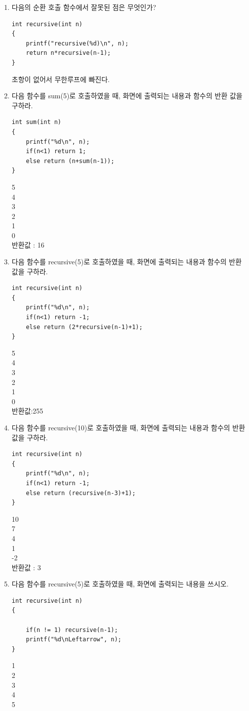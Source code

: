 \documentclass[11pt,a4paper]{article}
\begin{document}
\begin{enumerate}
\item 다음의 순환 호출 함수에서 잘못된 점은 무엇인가?
\begin{lstlisting}[frame=none]
int recursive(int n)
{
	printf("recursive(%d)\n", n);
	return n*recursive(n-1);
}
\end{lstlisting}
초항이 없어서 무한루프에 빠진다.
	
\item 다음 함수를 sum(5)로 호출하였을 때, 화면에 출력되는 내용과 함수의 반환 값을 구하라.
\begin{lstlisting}[frame=none]
int sum(int n)
{
	printf("%d\n", n);
	if(n<1) return 1;
	else return (n+sum(n-1));
}
\end{lstlisting}
5\\
4\\
3\\
2\\
1\\
0\\
반환값 : 16
\item 다음 함수를 recursive(5)로 호출하였을 때, 화면에 출력되는 내용과 함수의 반환 값을 구하라.
\begin{lstlisting}[frame=none]
int recursive(int n)
{
	printf("%d\n", n);
	if(n<1) return -1;
	else return (2*recursive(n-1)+1);
}
\end{lstlisting}
5\\
4\\
3\\
2\\
1\\
0\\
반환값:255
\item 다음 함수를 recursive(10)로 호출하였을 때, 화면에 출력되는 내용과 함수의 반환 값을 구하라.
\begin{lstlisting}[frame=none]
int recursive(int n)
{
	printf("%d\n", n);
	if(n<1) return -1;
	else return (recursive(n-3)+1);
}
\end{lstlisting}
10\\
7\\
4\\
1\\
-2\\
반환값 : 3

\item 다음 함수를 recursive(5)로 호출하였을 때, 화면에 출력되는 내용을 쓰시오.
\begin{lstlisting}[frame=none]
int recursive(int n)
{

	if(n != 1) recursive(n-1);
	printf("%d\nLeftarrow", n);
}
\end{lstlisting}
1\\2\\3\\4\\5\\


\end{enumerate}
\end{document}
